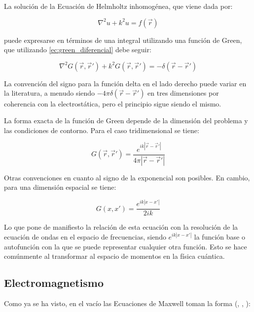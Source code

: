 La solución de la Ecuación de Helmholtz inhomogénea, que viene dada por:

\begin{equation}
    \nabla^2u + k^2 u = f(\vec{r})
\end{equation}

puede expresarse en términos de una integral utilizando una función de Green, que utilizando \ref{ec:green_diferencial} debe seguir:

\begin{equation}
    \nabla^2 G(\vec{r}, \vec{r}') + k^2 G(\vec{r}, \vec{r}') = -\delta(\vec{r} - \vec{r}')
\end{equation}

La convención del signo para la función delta en el lado derecho puede variar en la literatura, a menudo siendo $-4\pi\delta(\vec{r} - \vec{r}')$ en tres dimensiones por coherencia con la electrostática, pero el principio sigue siendo el mismo.

La forma exacta de la función de Green depende de la dimensión del problema y las condiciones de contorno. Para el caso tridimensional se tiene:

\begin{equation}
    G(\vec{r}, \vec{r}') = \frac{e^{ik|\vec{r} - \vec{r}'|}}{4\pi|\vec{r} - \vec{r}'|}
\end{equation}

Otras convenciones en cuanto al signo de la exponencial son posibles. En cambio, para una dimensión espacial se tiene:

\begin{equation}
    G(x, x') = \frac{e^{ik|x - x'|}}{2ik}
\end{equation}

Lo que pone de manifiesto la relación de esta ecuación con la resolución de la ecuación de ondas en el espacio de frecuencias, siendo $e^{ik|x - x'|}$ la función base o autofunción con la que se puede representar cualquier otra función. Esto se hace comúnmente al transformar al espacio de momentos en la física cuántica.

\subsection{Electromagnetismo}

Como ya se ha visto, en el vacío las Ecuaciones de Maxwell toman la forma (\cite{griffiths_introduction_2017}, \cite{jackson_classical_1975}, \cite{landau_electrodynamics_1993}): 

